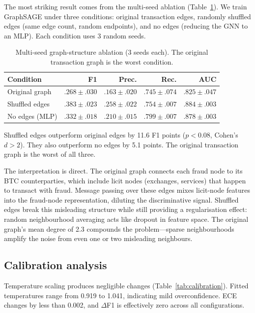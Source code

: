 \documentclass[11pt]{article}
\begin{document}
The most striking result comes from the multi-seed ablation
(Table~\ref{tab:ablation}).  We train GraphSAGE under three
conditions: original transaction edges, randomly shuffled edges (same
edge count, random endpoints), and no edges (reducing the GNN to an
MLP).  Each condition uses 3 random seeds.

\begin{table}[t]
\centering
\small
\caption{Multi-seed graph-structure ablation (3 seeds each).  The
original transaction graph is the worst condition.}
\label{tab:ablation}
\begin{tabular}{lrrrr}
\toprule
\textbf{Condition} & \textbf{F1} & \textbf{Prec.} & \textbf{Rec.}
  & \textbf{AUC} \\
\midrule
Original graph & $.268\!\pm\!.030$ & $.163\!\pm\!.020$
  & $.745\!\pm\!.074$ & $.825\!\pm\!.047$ \\
Shuffled edges & $\mathbf{.383\!\pm\!.023}$
  & $\mathbf{.258\!\pm\!.022}$ & $\mathbf{.754\!\pm\!.007}$
  & $\mathbf{.884\!\pm\!.003}$ \\
No edges (MLP) & $.332\!\pm\!.018$ & $.210\!\pm\!.015$
  & $.799\!\pm\!.007$ & $.878\!\pm\!.003$ \\
\bottomrule
\end{tabular}
\end{table}

Shuffled edges outperform original edges by 11.6 F1 points ($p <
0.08$, Cohen's $d > 2$).  They also outperform no edges by 5.1
points.  The original transaction graph is the worst of all three.

The interpretation is direct.  The original graph connects each fraud
node to its BTC counterparties, which include licit nodes (exchanges,
services) that happen to transact with fraud.  Message passing over
these edges mixes licit-node features into the fraud-node
representation, diluting the discriminative signal.  Shuffled edges
break this misleading structure while still providing a
regularisation effect: random neighbourhood averaging acts like
dropout in feature space.  The original graph's mean degree of 2.3
compounds the problem---sparse neighbourhoods amplify the noise from
even one or two misleading neighbours.

\subsection{Calibration analysis}

Temperature scaling produces negligible changes
(Table~\ref{tab:calibration}).  Fitted temperatures range from 0.919
to 1.041, indicating mild overconfidence.  ECE changes by less than
0.002, and $\Delta$F1 is effectively zero across all configurations.
\end{document}

